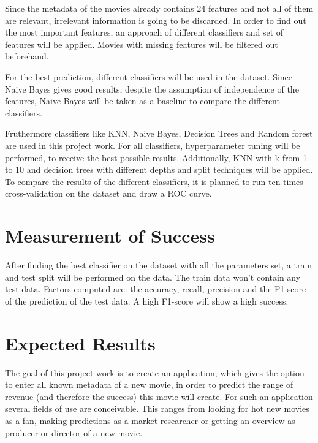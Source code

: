 Since the metadata of the movies already contains 24 features and not all of them are relevant, irrelevant information is going to be discarded. In order to find out the most important features, an approach of different classifiers and set of features will be applied. Movies with missing features will be filtered out beforehand. 

For the best prediction, different classifiers will be used in the dataset. Since Naive Bayes gives good results, despite the assumption of independence of the features, Naive Bayes will be taken as a baseline to compare the different classifiers. 

Fruthermore classifiers like KNN, Naive Bayes, Decision Trees and Random forest are used in this project work. For all classifiers, hyperparameter tuning will be performed, to receive the best possible results. Additionally, KNN with k from 1 to 10 and decision trees with different depths and split techniques will be applied.
To compare the results of the different classifiers, it is planned to run ten times cross-validation on the dataset and draw a ROC curve.


\section{Measurement of Success}
After finding the best classifier on the dataset with all the parameters set, a train and test split will be performed on the data. The train data won't contain any test data. Factors computed are: the accuracy, recall, precision and the F1 score of the prediction of the test data. A high F1-score will show a high success.

\section{Expected Results}
The goal of this project work is to create an application, which gives the option to enter all known metadata of a new movie, in order to predict the range of revenue (and therefore the success) this movie will create. For such an application several fields of use are conceivable. This ranges from looking for hot new movies as a fan, making predictions as a market researcher or getting an overview as producer or director of a new movie. 





